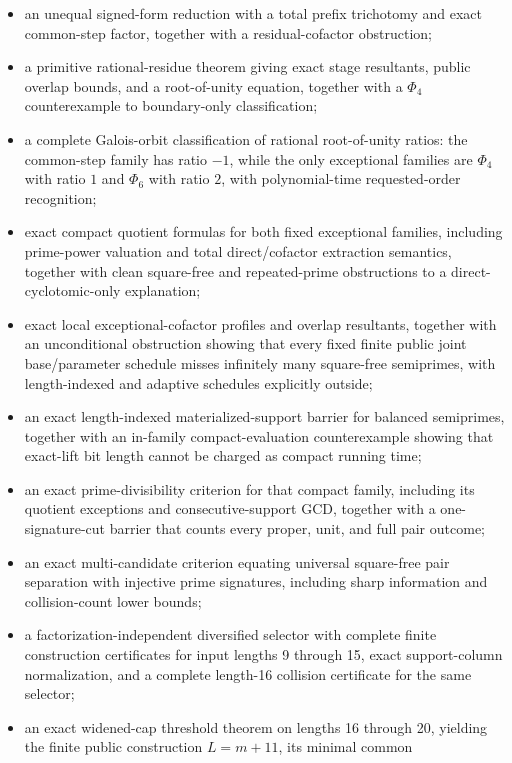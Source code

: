 \documentclass[11pt]{article}
\begin{document}
\begin{itemize}
\item an unequal signed-form reduction with a total prefix trichotomy and
  exact common-step factor, together with a residual-cofactor obstruction;
\item a primitive rational-residue theorem giving exact stage resultants,
  public overlap bounds, and a root-of-unity equation, together with a
  \(\Phi_4\) counterexample to boundary-only classification;
\item a complete Galois-orbit classification of rational root-of-unity
  ratios: the common-step family has ratio \(-1\), while the only exceptional
  families are \(\Phi_4\) with ratio \(1\) and \(\Phi_6\) with ratio \(2\),
  with polynomial-time requested-order recognition;
\item exact compact quotient formulas for both fixed exceptional families,
  including prime-power valuation and total direct/cofactor extraction
  semantics, together with clean square-free and repeated-prime obstructions
  to a direct-cyclotomic-only explanation;
\item exact local exceptional-cofactor profiles and overlap resultants,
  together with an unconditional obstruction showing that every fixed finite
  public joint base/parameter schedule misses infinitely many square-free
  semiprimes, with length-indexed and adaptive schedules explicitly outside;
\item an exact length-indexed materialized-support barrier for balanced
  semiprimes, together with an in-family compact-evaluation counterexample
  showing that exact-lift bit length cannot be charged as compact running
  time;
\item an exact prime-divisibility criterion for that compact family,
  including its quotient exceptions and consecutive-support GCD, together
  with a one-signature-cut barrier that counts every proper, unit, and full
  pair outcome;
\item an exact multi-candidate criterion equating universal square-free pair
  separation with injective prime signatures, including sharp information
  and collision-count lower bounds;
\item a factorization-independent diversified selector with complete finite
  construction certificates for input lengths 9 through 15, exact
  support-column normalization, and a complete length-16 collision
  certificate for the same selector;
\item an exact widened-cap threshold theorem on lengths 16 through 20,
  yielding the finite public construction \(L=m+11\), its minimal common

\end{itemize}
\end{document}
